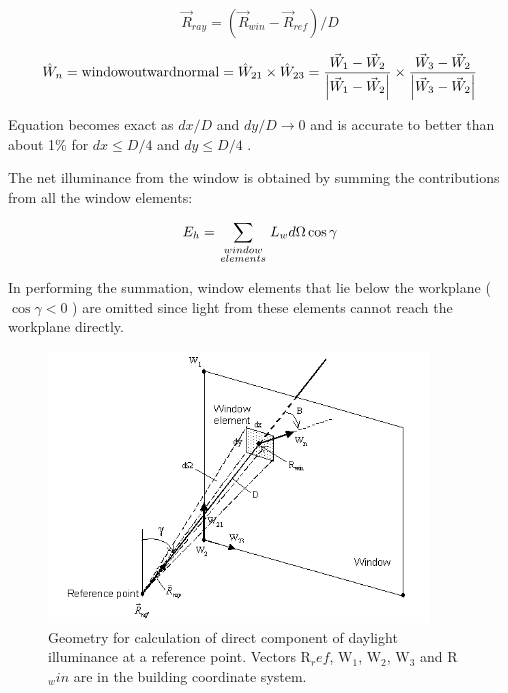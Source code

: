 \begin{equation}
{\vec R_{ray}} = ({\vec R_{win}} - {\vec R_{ref}})/D
\end{equation}

\begin{equation}
{\hat W_n} = {\rm{ window outward normal }} = {\hat W_{21}} \times {\hat W_{23}} = \frac{{{{\vec W}_1} - {{\vec W}_2}}}{{\left| {{{\vec W}_1} - {{\vec W}_2}} \right|}} \times \frac{{{{\vec W}_3} - {{\vec W}_2}}}{{\left| {{{\vec W}_3} - {{\vec W}_2}} \right|}}
\end{equation}

Equation becomes exact as \(dx/D\) and \(dy/D \to 0\) and is accurate to better than about 1\% for \(dx \le D/4\) and \(dy \le D/4\) .

The net illuminance from the window is obtained by summing the contributions from all the window elements:

\begin{equation}
{E_h} = \sum\limits_{\scriptstyle window\atop\scriptstyle elements} {{L_w}d\Omega \cos \gamma }
\end{equation}

In performing the summation, window elements that lie below the workplane (\(\cos \gamma \lt 0\) ) are omitted since light from these elements cannot reach the workplane directly.

\begin{figure}[hbtp] %
\centering
\includegraphics[width=0.9\textwidth, height=0.9\textheight, keepaspectratio=true]{media/image755.png}
\caption{  Geometry for calculation of direct component of daylight illuminance at a reference point. Vectors R\(_ref\), W\(_1\), W\(_2\), W\(_3\) and R\(_win\) are in the building coordinate system. \protect \label{fig:geometry-for-calculation-of-direct-component}}
\end{figure}

